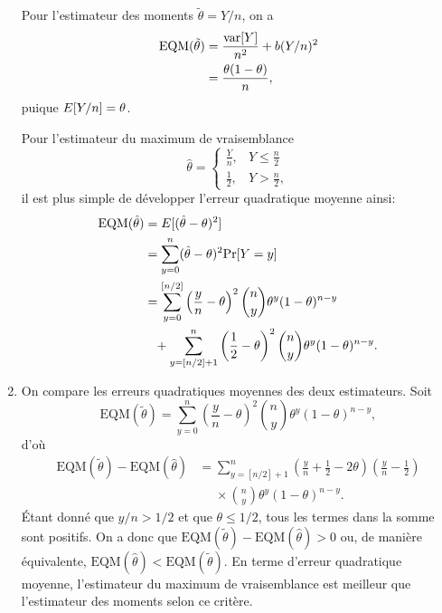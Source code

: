 \begin{solution}{4.15}
\begin{enumerate}
      Pour l'estimateur des moments $\tilde{\theta} = Y/n$, on a
      \begin{align*}
        \mbox{EQM}(\tilde{\theta}) &= \frac{\mathrm{var}\! \left[ Y \right]}{n^2} +
        b(Y/n)^2 \\
        &= \frac{\theta (1 - \theta)}{n},
      \end{align*}
      puique $E [ Y/n ] = \theta$.

      Pour l'estimateur du maximum de vraisemblance
      \begin{equation*}
        \hat{\theta} =
        \begin{cases}
          \frac{Y}{n}, & Y \leq \frac{n}{2} \\
          \frac{1}{2}, & Y > \frac{n}{2},
        \end{cases}
      \end{equation*}
      il est plus simple de développer l'erreur quadratique moyenne
      ainsi:
      \begin{align*}
        \mbox{EQM}(\hat{\theta}) &= E [ (\hat{\theta} - \theta)^2 ] \\
        &= \sum_{y = 0}^n (\hat{\theta} - \theta)^2 \mathrm{Pr} [ Y = y ] \\
        &= \sum_{y = 0}^{[n/2]}
        \left(
          \frac{y}{n} - \theta
        \right)^2 \binom{n}{y} \theta^y (1 - \theta)^{n - y} \\
        &\phantom{=} +
        \sum_{y = [n/2] + 1}^n
        \left(
          \frac{1}{2} - \theta
        \right)^2 \binom{n}{y} \theta^y (1 - \theta)^{n - y}.
      \end{align*}
    \item On compare les erreurs quadratiques moyennes des deux
      estimateurs. Soit
      \begin{displaymath}
        \mbox{EQM}(\tilde{\theta}) = \sum_{y = 0}^n
        \left(
          \frac{y}{n} - \theta
        \right)^2 \binom{n}{y} \theta^y (1 - \theta)^{n - y},
      \end{displaymath}
      d'où
      \begin{align*}
        \mbox{EQM}(\tilde{\theta}) - \mbox{EQM}(\hat{\theta}) &=
        \sum_{y=[n/2] + 1}^n
        \left(
          \frac{y}{n} + \frac{1}{2} - 2 \theta
        \right)
        \left(
          \frac{y}{n} - \frac{1}{2}
        \right) \\
        &\phantom{=} \times
        \binom{n}{y} \theta^y (1 - \theta)^{n - y}.
      \end{align*}
      Étant donné que $y/n > 1/2$ et que $\theta \leq 1/2$, tous les
      termes dans la somme sont positifs. On a donc que
      $\mbox{EQM}(\tilde{\theta}) - \mbox{EQM}(\hat{\theta}) > 0$ ou, de manière
      équivalente, $\mbox{EQM}(\hat{\theta}) < \mbox{EQM}(\tilde{\theta})$. En terme
      d'erreur quadratique moyenne, l'estimateur du maximum de
      vraisemblance est meilleur que l'estimateur des moments selon ce critère.
    \end{enumerate}
  
\end{solution}
